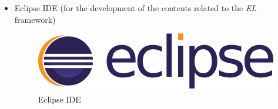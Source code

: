 \begin{itemize}
\item Eclipse IDE (for the development of the contents related to the \textit{EL} framework)

\begin{figure}[!htb]
\centering
\includegraphics[scale=0.2]{images/eclipse}
\caption{Eclipse\textsuperscript{\textregistered} IDE}
\label{fig:Eclipse_logo} 
\end{figure}

\end{itemize}

